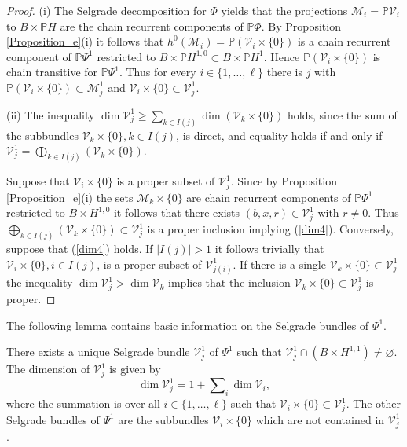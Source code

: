 	\begin{proof}
		(i) The Selgrade decomposition for $\Phi$ yields that the projections
		$\mathcal{M}_{i}=\mathbb{P}\mathcal{V}_{i}$ to $B\times\mathbb{P}H$ are the
		chain recurrent components of $\mathbb{P}\Phi$. By Proposition
		\ref{Proposition_e}(i) it follows that $h^{0}(\mathcal{M}_{i})=\mathbb{P}%
		\left(  \mathcal{V}_{i}\times\{0\}\right)  $ is a chain recurrent component of
		$\mathbb{P}\Psi^{1}$ restricted to $B\times\mathbb{P}H^{1,0}\subset
		B\times\mathbb{P}H^{1}$. Hence $\mathbb{P}\left(  \mathcal{V}_{i}%
		\times\{0\}\right)  $ is chain transitive for $\mathbb{P}\Psi^{1}$. Thus for
		every $i\in\{1,\ldots,\ell\}$ there is $j$ with $\mathbb{P}\left(
		\mathcal{V}_{i}\times\{0\}\right)  \subset\mathcal{M}_{j}^{1}$ and
		$\mathcal{V}_{i}\times\{0\}\subset\mathcal{V}_{j}^{1}$.
		
		(ii) The inequality $\dim\mathcal{V}_{j}^{1}\geq\sum\nolimits_{k\in I(j)}%
		\dim\left(  \mathcal{V}_{k}\times\{0\}\right)  $ holds, since the sum of the
		subbundles $\mathcal{V}_{k}\times\{0\},k\in I(j)$, is direct, and equality
		holds if and only if $\mathcal{V}_{j}^{1}=\bigoplus_{k\in I(j)}\left(
		\mathcal{V}_{k}\times\{0\}\right)  $.
		
		Suppose that $\mathcal{V}_{i}\times\{0\}$ is a proper subset of $\mathcal{V}%
		_{j}^{1}$. Since by Proposition \ref{Proposition_e}(i) the sets $\mathcal{M}%
		_{k}\times\{0\}$ are chain recurrent components of $\mathbb{P}\Psi^{1}$
		restricted to $B\times H^{1,0}$ it follows that there exists $(b,x,r)\in
		\mathcal{V}_{j}^{1}$ with $r\not =0$. Thus $\bigoplus\nolimits_{k\in
			I(j)}\left(  \mathcal{V}_{k}\times\{0\}\right)  \subset\mathcal{V}_{j}^{1}$ is
		a proper inclusion implying (\ref{dim4}). Conversely, suppose that
		(\ref{dim4}) holds. If $\left\vert I(j)\right\vert >1$ it follows trivially
		that $\mathcal{V}_{i}\times\{0\},i\in I(j)$, is a proper subset of
		$\mathcal{V}_{j(i)}^{1}$. If there is a single $\mathcal{V}_{k}\times
		\{0\}\subset\mathcal{V}_{j}^{1}$ the inequality $\dim\mathcal{V}_{j}^{1}%
		>\dim\mathcal{V}_{k}$ implies that the inclusion $\mathcal{V}_{k}%
		\times\{0\}\subset\mathcal{V}_{j}^{1}$ is proper.
	\end{proof}
	
	The following lemma contains basic information on the Selgrade bundles of
	$\Psi^{1}$.
	
	\begin{lemma}
		\label{Lemma_affine2}There exists a unique Selgrade bundle $\mathcal{V}%
		_{j}^{1}$ of $\Psi^{1}$ such that $\mathcal{V}_{j}^{1}\cap\left(  B\times
		H^{1,1}\right)  \not =\varnothing$. The dimension of $\mathcal{V}_{j}^{1}$ is
		given by
		\begin{equation}
			\dim\mathcal{V}_{j}^{1}=1+\sum\nolimits_{i}\dim\mathcal{V}_{i}, \label{dim0}%
		\end{equation}
		where the summation is over all $i\in\{1,\ldots,\ell\}$ such that
		$\mathcal{V}_{i}\times\{0\}\subset\mathcal{V}_{j}^{1}$. The other Selgrade
		bundles of $\Psi^{1}$ are the subbundles $\mathcal{V}_{i}\times\{0\}$ which
		are not contained in $\mathcal{V}_{j}^{1}$.
	\end{lemma}
	
